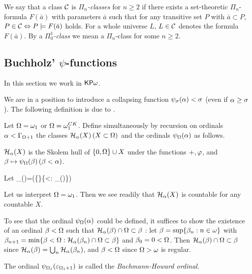 \documentclass{article}
\begin{document}
\bdf
{\rm
We say that a class ${\cal C}$ is \textit{$\Pi_{n}$-classes} for $n\geq 2$ if there exists a set-theoretic 
$\Pi_{n}$-formula $F(\bar{a})$ with parameters $\bar{a}$ such that for any transitive set $P$ with 
$\bar{a}\subset P$,
$P\in{\cal C}\Leftrightarrow P\models F(\bar{a})$ holds.
For a whole universe $L$, $L\in{\cal C}$ denotes the formula $F(\bar{a})$.
By a \textit{$\Pi^{1}_{0}$-class} we mean a $\Pi_{n}$-class for some $n\geq 2$.
}
\edf







\subsection{Buchholz' $\psi$-functions}\label{sect:collapsing}

In this section we work in ${\sf KP}\omega$. 



We are in a position to introduce a collapsing function $\psi_{\sigma}(\alpha)<\sigma$ (even if $\alpha\geq\sigma$).
The following definition is due to \cite{Buchholz86}.


\bdf\label{df:HKP}
{\rm 
Let $\Omega=\omega_{1}$ or $\Omega=\omega_{1}^{CK}$.
Define simultaneously by recursion on ordinals $\alpha<\Gamma_{\Omega+1}$ the classes
 ${\cal H}_{\alpha}(X)\, (X\subset \Omega)$ and the ordinals $\psi_{\Omega}(\alpha)$ as follows.

${\cal H}_{\alpha}(X)$ is the Skolem hull of $\{0,\Omega\}\cup X$ under the functions
$+, \varphi$, and
$\beta\mapsto\psi_{\Omega}(\beta)\,(\beta<\alpha)$.

Let 
\beqn\label{eq:psidf}
\psi_{\Ome}(\alp)=\min(\{\Ome\}\cup\{\bet<\Ome:  \calh_{\alp}(\bet)\cap\Ome\subset \bet\})
\eeqn
}
\edf

Let us interpret $\Omega=\omega_{1}$.
Then we see readily
that 
${\cal H}_{\alpha}(X)$ is countable for any countable $X$.


To see that the ordinal $\psi_{\Omega}(\alpha)$ could be defined, it suffices to show the existence of 
an ordinal $\beta<\Omega$ such that 
${\cal H}_{\alpha}(\beta)\cap\Omega\subset\beta$ :
let $\beta=\sup\{\beta_{n}:n\in\omega\}$ with 
$\beta_{n+1}=\min\{\beta<\Omega:{\cal H}_{\alpha}(\beta_{n})\cap\Omega\subset\beta\}$
and $\beta_{0}=0<\Omega$.
Then 
${\cal H}_{\alpha}(\beta)\cap\Omega\subset\beta$ since 
${\cal H}_{\alpha}(\beta)=\bigcup_{n}{\cal H}_{\alpha}(\beta_{n})$,
and $\beta<\Omega$ since $\Omega>\omega$ is regular.



The ordinal $\psi_{\Omega_{1}}(\varepsilon_{\Omega_{1}+1})$ is called the 
\textit{Bachmann-Howard ordinal}.
\end{document}
